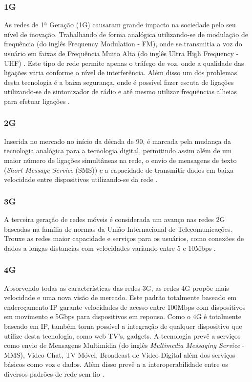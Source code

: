 \subsubsection{1G}
As redes de 1ª Geração (1G) causaram grande impacto na sociedade pelo seu nível de inovação. Trabalhando de forma analógica utilizando-se de modulação de frequência (do inglês Frequency Modulation - FM), onde se transmitia a voz do usuário em faixas de Frequência Muito Alta (do inglês Ultra High Frequency - UHF) \cite{AEvolucaoTelefoniaCelular}. Este tipo de rede permite apenas o tráfego de voz, onde a qualidade das ligações varia conforme o nível de interferência. Além disso um dos problemas desta tecnologia é a baixa segurança, onde é possível fazer escuta de ligações utilizando-se de sintonizador de rádio e até mesmo utilizar frequências alheias para efetuar ligações  \cite{GeracoesTelefoniaMovel}.

\subsubsection{2G}
Inserida no mercado no início da década de 90, é marcada pela mudança da tecnologia analógica para a tecnologia digital, permitindo assim além de um maior número de ligações simultâneas na rede, o envio de mensagens de texto (\emph{Short Message Service} (SMS)) e a capacidade de transmitir dados em baixa velocidade entre dispositivos utilizando-se da rede \cite{GeracoesTelefoniaMovel}.

\subsubsection{3G}
A terceira geração de redes móveis é considerada um avanço nas redes 2G baseadas na família de normas da União Internacional de Telecomunicações. Trouxe as redes maior capacidade e serviços para os usuários, como conexões de dados a longas distancias com velocidades variando entre 5 e 10Mbps \cite{GeracoesTelefoniaMovel}.

\subsubsection{4G}
Absorvendo todas as características das redes 3G, as redes 4G propõe mais velocidade e uma nova visão de mercado. Este padrão totalmente baseado em endereçamento IP garante velocidades de acesso entre 100Mbps com dispositivos em movimento e 5Gbps para dispositivos em repouso. Como o 4G é totalmente baseado em IP, também torna possível a integração de qualquer dispositivo que utilize desta tecnologia, como web TV's, gadgets. A tecnologia prevê a serviços como envio de Mensagens Multimídia (do inglês \emph{Multimedia Messaging Service} - MMS), Video Chat, TV Móvel, Broadcast de Video Digital além dos serviços básicos como voz e dados. Além disso prevê a a interoperabilidade entre os diversos padrões de rede sem fio \cite{GeracoesTelefoniaMovel}.
